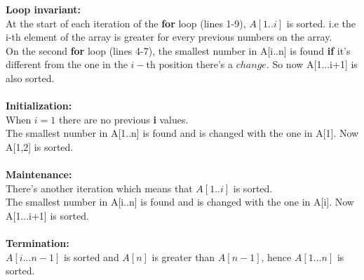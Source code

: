 \documentclass[12pt, twoside, a4paper]{article}
\begin{document}
  \textbf{Loop invariant:}\\ At the start of each iteration of the \textbf{for} loop (lines 1-9), $A[1..i]$ is sorted. i.e the i-th element of the array is
  greater for every previous numbers on the array.\\
  On the second \textbf{for} loop (lines 4-7), the smallest number in A[i..n] is found \textbf{if} it's different from the one in the $i-$th position there's
  a $change$. So now A[1...i+1] is also sorted.\\ \\
  \textbf{Initialization:} \\ 
  When $i = 1$ there are no previous \textbf{i} values.\\
  The smallest number in A[1..n] is found and is changed with the one in
   A[1]. Now A[1,2] is sorted. \\ \\
  \textbf{Maintenance:} \\
  There's another iteration which means that $A[1..i]$ is sorted. \\
  The smallest number in A[i..n] is found and is changed with the one in
  A[i]. Now A[1...i+1] is sorted. \\ \\
  \textbf{Termination:}\\
  $A[i...n-1]$ is sorted and $A[n]$ is greater than $A[n-1]$,
  hence $A[1...n]$ is sorted.\\
\end{document}
